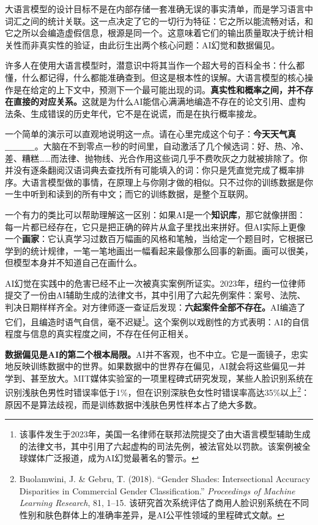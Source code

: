 大语言模型的设计目标不是在内部存储一套准确无误的事实清单，而是学习语言中词汇之间的统计关联。这一点决定了它的一切行为特征：它之所以能流畅对话，和它之所以会编造虚假信息，根源是同一个。这意味着它们的输出质量取决于统计相关性而非真实性的验证，由此衍生出两个核心问题：AI幻觉和数据偏见。

许多人在使用大语言模型时，潜意识中将其当作一个超大号的百科全书：什么都懂，什么都记得，什么都能准确查到。但这是根本性的误解。大语言模型的核心操作是在给定的上下文中，预测下一个最可能出现的词。\textbf{真实性和概率之间，并不存在直接的对应关系。}这就是为什么AI能信心满满地编造不存在的论文引用、虚构法条、生成错误的历史年代，它不是在说谎，而是在执行概率接龙。

一个简单的演示可以直观地说明这一点。请在心里完成这个句子：\textbf{今天天气真\_\_\_\_}。大脑在不到零点一秒的时间里，自动激活了几个候选词：好、热、冷、差、糟糕……而法律、抛物线、光合作用这些词几乎不费吹灰之力就被排除了。你并没有逐条翻阅汉语词典去查找所有可能填入的词：你只是凭直觉完成了概率排序。大语言模型做的事情，在原理上与你刚才做的相似。只不过你的训练数据是你一生中听到和读到的所有中文；而它的训练数据，是整个互联网。

一个有力的类比可以帮助理解这一区别：如果AI是一个\textbf{知识库}，那它就像拼图：每一片都已经存在，它只是把正确的碎片从盒子里找出来拼好。但AI实际上更像一个\textbf{画家}：它认真学习过数百万幅画的风格和笔触，当给定一个题目时，它根据已学到的统计规律，一笔一笔地画出一幅看起来最像那么回事的新画。画可以很美，但模型本身并不知道自己在画什么。

AI幻觉在实践中的危害已经不止一次被真实案例所证实。2023年，纽约一位律师提交了一份由AI辅助生成的法律文书，其中引用了六起先例案件：案号、法院、判决日期样样齐全。对方律师逐一查证后发现：\textbf{六起案件全部不存在。}AI编造了它们，且编造时语气自信，毫不迟疑\footnote{该事件发生于2023年，美国一名律师在联邦法院提交了由大语言模型辅助生成的法律文书，其中引用了六起虚构的司法先例，被法官处以罚款。该案例被全球媒体广泛报道，成为AI幻觉最著名的警示。}。这个案例以戏剧性的方式表明：AI的自信程度与信息的真实程度之间，不存在任何正相关。

\textbf{数据偏见是AI的第二个根本局限。}AI并不客观，也不中立。它是一面镜子，忠实地反映训练数据中的世界。如果数据中的世界存在偏见，AI就会将这些偏见一并学到、甚至放大。MIT媒体实验室的一项里程碑式研究发现，某些人脸识别系统在识别浅肤色男性时错误率低于1\%，但在识别深肤色女性时错误率高达35\%以上\footnote{Buolamwini, J. \& Gebru, T. (2018). ``Gender Shades: Intersectional Accuracy Disparities in Commercial Gender Classification.'' \emph{Proceedings of Machine Learning Research}, 81, 1--15. 该研究首次系统评估了商用人脸识别系统在不同性别和肤色群体上的准确率差异，是AI公平性领域的里程碑式文献。}：原因不是算法歧视，而是训练数据中浅肤色男性样本占了绝大多数。

